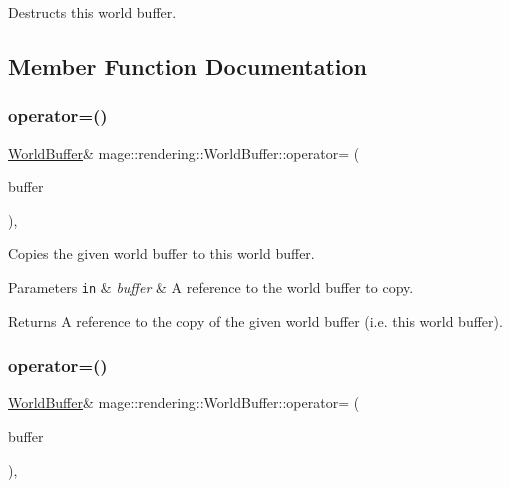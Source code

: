 Destructs this world buffer. 

\subsection{Member Function Documentation}
\mbox{\label{structmage_1_1rendering_1_1_world_buffer_a0a776f3c84577f8530cf5932274cd8c9}} 
\subsubsection{\texorpdfstring{operator=()}{operator=()}\hspace{0.1cm}{\footnotesize\ttfamily [1/2]}}
{\footnotesize\ttfamily \mbox{\hyperlink{structmage_1_1rendering_1_1_world_buffer}{World\+Buffer}}\& mage\+::rendering\+::\+World\+Buffer\+::operator= (\begin{DoxyParamCaption}\item[{const \mbox{\hyperlink{structmage_1_1rendering_1_1_world_buffer}{World\+Buffer}} \&}]{buffer }\end{DoxyParamCaption})\hspace{0.3cm}{\ttfamily [default]}, {\ttfamily [noexcept]}}

Copies the given world buffer to this world buffer.


\begin{DoxyParams}[1]{Parameters}
\mbox{\tt in}  & {\em buffer} & A reference to the world buffer to copy. \\
\hline
\end{DoxyParams}
\begin{DoxyReturn}{Returns}
A reference to the copy of the given world buffer (i.\+e. this world buffer). 
\end{DoxyReturn}
\mbox{\label{structmage_1_1rendering_1_1_world_buffer_a3fcc219d1410d858cc3b15f1cac5da9a}} 
\subsubsection{\texorpdfstring{operator=()}{operator=()}\hspace{0.1cm}{\footnotesize\ttfamily [2/2]}}
{\footnotesize\ttfamily \mbox{\hyperlink{structmage_1_1rendering_1_1_world_buffer}{World\+Buffer}}\& mage\+::rendering\+::\+World\+Buffer\+::operator= (\begin{DoxyParamCaption}\item[{\mbox{\hyperlink{structmage_1_1rendering_1_1_world_buffer}{World\+Buffer}} \&\&}]{buffer }\end{DoxyParamCaption})\hspace{0.3cm}{\ttfamily [default]}, {\ttfamily [noexcept]}}

